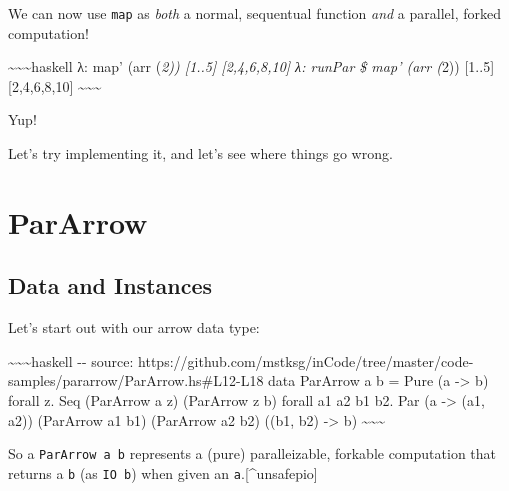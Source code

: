 \documentclass[]{article}
\begin{document}
We can now use \texttt{map\textquotesingle{}} as \emph{both} a normal,
sequentual function \emph{and} a parallel, forked computation!

\textasciitilde{}\textasciitilde{}\textasciitilde{}haskell λ: map' (arr
(\emph{2)) {[}1..5{]} {[}2,4,6,8,10{]} λ: runPar \$ map' (arr (}2)) {[}1..5{]}
{[}2,4,6,8,10{]} \textasciitilde{}\textasciitilde{}\textasciitilde{}

Yup!

Let's try implementing it, and let's see where things go wrong.

\section{ParArrow}

\subsection{Data and Instances}

Let's start out with our arrow data type:

\textasciitilde{}\textasciitilde{}\textasciitilde{}haskell -\/- source:
https://github.com/mstksg/inCode/tree/master/code-samples/pararrow/ParArrow.hs\#L12-L18
data ParArrow a b = Pure (a -\textgreater{} b) \textbar{} forall z. Seq
(ParArrow a z) (ParArrow z b) \textbar{} forall a1 a2 b1 b2. Par (a
-\textgreater{} (a1, a2)) (ParArrow a1 b1) (ParArrow a2 b2) ((b1, b2)
-\textgreater{} b) \textasciitilde{}\textasciitilde{}\textasciitilde{}

So a \texttt{ParArrow\ a\ b} represents a (pure) paralleizable, forkable
computation that returns a \texttt{b} (as \texttt{IO\ b}) when given an
\texttt{a}.{[}\^{}unsafepio{]}
\end{document}
